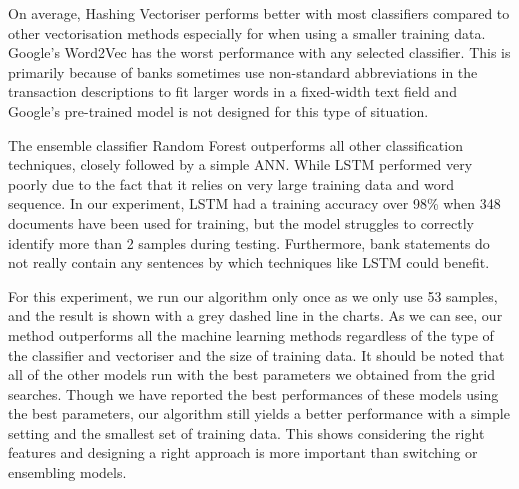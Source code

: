 On average, Hashing Vectoriser performs better with most classifiers compared to other vectorisation methods especially for when using a smaller training data. Google's Word2Vec has the worst performance with any selected classifier. This is primarily because of banks sometimes use non-standard abbreviations in the transaction descriptions to fit larger words in a fixed-width text field and Google's pre-trained model is not designed for this type of situation.

The ensemble classifier Random Forest outperforms all other classification techniques, closely followed by a simple ANN. While LSTM performed very poorly due to the fact that it relies on very large training data and word sequence. In our experiment, LSTM had a training accuracy over 98\% when 348 documents have been used for training, but the model struggles to correctly identify more than 2 samples during testing.  Furthermore, bank statements do not really contain any sentences by which techniques like LSTM could benefit.
 
For this experiment, we run our algorithm only once as we only use 53 samples, and the result is shown with a grey dashed line in the charts. As we can see, our method outperforms all the machine learning methods regardless of the type of the classifier and vectoriser and the size of training data. It should be noted that all of the other models run with the best parameters we obtained from the grid searches. Though we have reported the best performances of these models using the best parameters, our algorithm still yields a better performance with a simple setting and the smallest set of training data. This shows considering the right features and designing a right approach is more important than switching or ensembling models.

